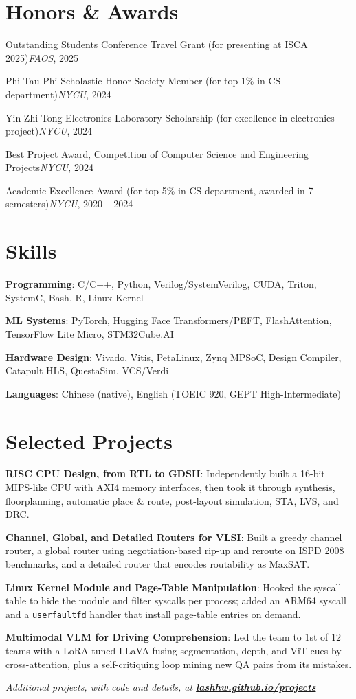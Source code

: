\documentclass[a4paper,11pt]{article}
\newlength{\compactsep}   \setlength{\compactsep}{2pt}   %
\newlength{\notesep}      \setlength{\notesep}{4pt}      %
\newcommand{\lrline}[2]{#1\hfill#2}
\newcommand{\resumeAward}[2]{\item \small\lrline{#1}{#2}}
\newcommand{\resumeSubItem}[2]{\item \small\textbf{#1}: #2}
\newcommand{\resumeNote}[1]{\par\addvspace{\notesep}\item \small\textit{#1}}
\newcommand{\subnote}[1]{{\footnotesize\textup{\textcolor[gray]{0.45}{(#1)}}}}
\begin{document}
\section{Honors \& Awards}
  \begin{entries}[itemsep=\compactsep]
    \resumeAward{Outstanding Students Conference Travel Grant \subnote{for presenting at ISCA 2025}}{\textit{FAOS}, 2025}
    \resumeAward{Phi Tau Phi Scholastic Honor Society Member \subnote{for top 1\% in CS department}}{\textit{NYCU}, 2024}
    \resumeAward{Yin Zhi Tong Electronics Laboratory Scholarship \subnote{for excellence in electronics project}}{\textit{NYCU}, 2024}
    \resumeAward{Best Project Award, Competition of Computer Science and Engineering Projects}{\textit{NYCU}, 2024}
    \resumeAward{Academic Excellence Award \subnote{for top 5\% in CS department, awarded in 7 semesters}}{\textit{NYCU}, 2020 -- 2024}
  \end{entries}

\section{Skills}
  \begin{entries}[itemsep=\compactsep]
    \resumeSubItem{Programming}
      {C/C++, Python, Verilog/SystemVerilog, CUDA, Triton, SystemC, Bash, R, Linux Kernel}
    \resumeSubItem{ML Systems}
      {PyTorch, Hugging Face Transformers/PEFT, FlashAttention, TensorFlow Lite Micro, STM32Cube.AI}
    \resumeSubItem{Hardware Design}
      {Vivado, Vitis, PetaLinux, Zynq MPSoC, Design Compiler, Catapult HLS, QuestaSim, VCS/Verdi}
    \resumeSubItem{Languages}
      {Chinese (native), English (TOEIC 920, GEPT High-Intermediate)}
  \end{entries}

\section{Selected Projects}
  \begin{entries}
    \resumeSubItem{RISC CPU Design, from RTL to GDSII}
      {Independently built a 16-bit MIPS-like CPU with AXI4 memory interfaces, then took it through synthesis, floorplanning, automatic place \& route, post-layout simulation, STA, LVS, and DRC.}
    \resumeSubItem{Channel, Global, and Detailed Routers for VLSI}
      {Built a greedy channel router, a global router using negotiation-based rip-up and reroute on ISPD 2008 benchmarks, and a detailed router that encodes routability as MaxSAT.}
    \resumeSubItem{Linux Kernel Module and Page-Table Manipulation}
      {Hooked the syscall table to hide the module and filter syscalls per process; added an ARM64 syscall and a \texttt{userfaultfd} handler that install page-table entries on demand.}
    \resumeSubItem{Multimodal VLM for Driving Comprehension}
      {Led the team to 1st of 12 teams with a LoRA-tuned LLaVA fusing segmentation, depth, and ViT cues by cross-attention, plus a self-critiquing loop mining new QA pairs from its mistakes.}
    \resumeNote{Additional projects, with code and details, at \href{https://lashhw.github.io/projects/}{\textbf{lashhw.github.io/projects}}}
  \end{entries}

\end{document}
